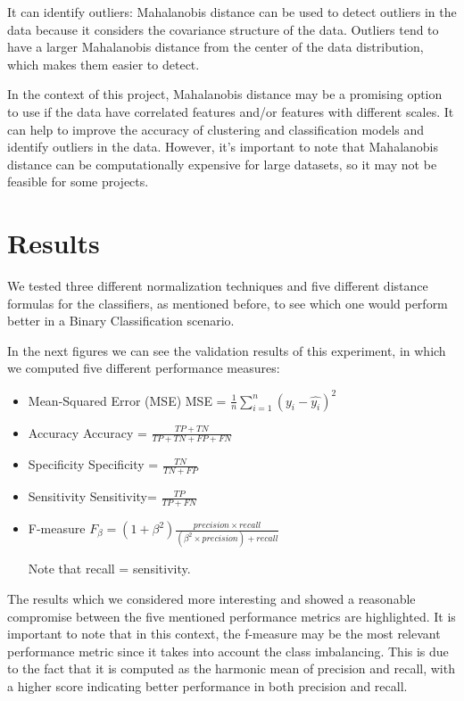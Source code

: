 \documentclass[12pt, a4paper]{article}
\begin{document}
It can identify outliers: Mahalanobis distance can be used to detect outliers in the data because it considers the covariance structure of the data. Outliers tend to have a larger Mahalanobis distance from the center of the data distribution, which makes them easier to detect.

In the context of this project, Mahalanobis distance may be a promising option to use if the data have correlated features and/or features with different scales. It can help to improve the accuracy of clustering and classification models and identify outliers in the data. However, it's important to note that Mahalanobis distance can be computationally expensive for large datasets, so it may not be feasible for some projects.

\section{Results}

We tested three different normalization techniques and five different distance formulas for the classifiers, as mentioned before, to see which one would perform better in a Binary Classification scenario.

In the next figures we can see the validation results of this experiment, in which we computed five different performance measures:

\begin{itemize}
    \item Mean-Squared Error (MSE)
    MSE = $\frac{1}{n} \sum_{i=1}^{n}(y_i - \hat{y_i})^2$
    \item Accuracy
    Accuracy =  $\frac{TP + TN}{TP + TN + FP + FN}$
    \item Specificity 
    Specificity = $\frac{TN}{TN + FP}$
    \item Sensitivity
    Sensitivity= $\frac{TP}{TP + FN}$
    \item F-measure
    $F_{\beta} = (1 + \beta^2) \frac{precision \times recall}{(\beta^2 \times precision) + recall}$

    \vspace{0.5cm}
    \small{Note that recall = sensitivity.}
    
\end{itemize}

The results which we considered more interesting and showed a reasonable compromise between the five mentioned performance metrics are highlighted. It is important to note that in this context, the f-measure may be the most relevant performance metric since it takes into account the class imbalancing. This is due to the fact that it is computed as the harmonic mean of precision and recall, with a higher score indicating better performance in both precision and recall.
\end{document}
